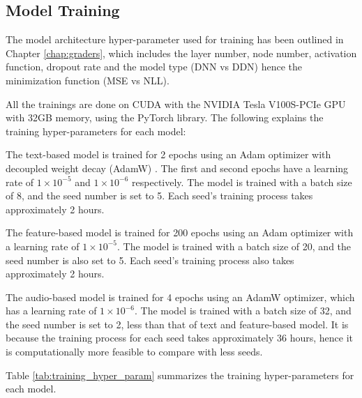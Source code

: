 \subsection{Model Training}
The model architecture hyper-parameter used for training has been outlined in Chapter \ref{chap:graders}, which includes the layer number, node number, activation function, dropout rate and the model type (DNN vs DDN) hence the minimization function (MSE vs NLL).

All the trainings are done on CUDA with the NVIDIA Tesla V100S-PCIe GPU with 32GB memory, using the PyTorch library.  The following explains the training hyper-parameters for each model:

The text-based model is trained for 2 epochs using an Adam optimizer with decoupled weight decay (AdamW) . The first and second epochs have a learning rate of $1 \times 10^{-5}$ and $1 \times 10^{-6}$ respectively. The model is trained with a batch size of 8, and the seed number is set to 5. Each seed's training process takes approximately 2 hours.

The feature-based model is trained for 200 epochs using an Adam optimizer with a learning rate of $1 \times 10^{-5}$. The model is trained with a batch size of 20, and the seed number is also set to 5. Each seed's training process also takes approximately 2 hours.

The audio-based model is trained for 4 epochs using an AdamW optimizer, which has a learning rate of $1 \times 10^{-6}$. The model is trained with a batch size of 32, and the seed number is set to 2, less than that of text and feature-based model. It is because the training process for each seed takes approximately 36 hours, hence it is computationally more feasible to compare with less seeds.


Table \ref{tab:training_hyper_param} summarizes the training hyper-parameters for each model.

